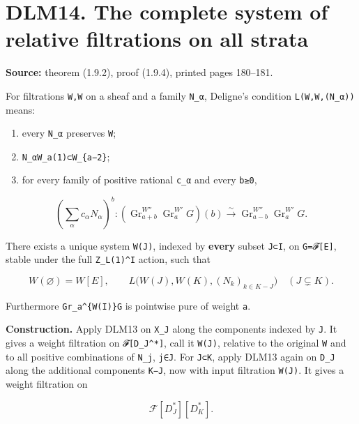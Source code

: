 \documentclass[
]{report}
\providecommand{\tightlist}{%
  \setlength{\itemsep}{0pt}\setlength{\parskip}{0pt}}
\begin{document}
\section{DLM14. The complete system of relative filtrations on all
strata}\label{dlm14.-the-complete-system-of-relative-filtrations-on-all-strata}

\textbf{Source:} theorem (1.9.2), proof (1.9.4), printed pages 180--181.

For filtrations
\texttt{W\textquotesingle{},W\textquotesingle{}\textquotesingle{}} on a
sheaf and a family \texttt{N\_α}, Deligne's condition
\texttt{L(W\textquotesingle{},W\textquotesingle{}\textquotesingle{},(N\_α))}
means:

\begin{enumerate}
\def\labelenumi{\arabic{enumi}.}
\tightlist
\item
  every \texttt{N\_α} preserves \texttt{W\textquotesingle{}};
\item
  \texttt{N\_αW\textquotesingle{}\textquotesingle{}\_a(1)⊂W\textquotesingle{}\textquotesingle{}\_\{a−2\}};
\item
  for every family of positive rational \texttt{c\_α} and every
  \texttt{b≥0},
\end{enumerate}

\[
\left(\sum_\alpha c_\alpha N_\alpha\right)^b:
\left(\operatorname{Gr}_{a+b}^{W''}\operatorname{Gr}_a^{W'}G\right)(b)
\xrightarrow{\sim}
\operatorname{Gr}_{a-b}^{W''}\operatorname{Gr}_a^{W'}G.
\tag{DLM14.1}
\]

There exists a unique system \texttt{W(J)}, indexed by \textbf{every}
subset \texttt{J⊂I}, on \texttt{G=𝓕{[}E{]}}, stable under the full
\texttt{Z\_L(1)\^{}I} action, such that

\[
W(\varnothing)=W[E],\qquad
L\bigl(W(J),W(K),(N_k)_{k\in K-J}\bigr)
\quad(J\subsetneq K).
\tag{DLM14.2}
\]

Furthermore \texttt{Gr\_a\^{}\{W(I)\}G} is pointwise pure of weight
\texttt{a}.

\textbf{Construction.} Apply DLM13 on \texttt{X\_J} along the components
indexed by \texttt{J}. It gives a weight filtration on
\texttt{𝓕{[}D\_J\^{}*{]}}, call it \texttt{W(J)}, relative to the
original \texttt{W} and to all positive combinations of \texttt{N\_j},
\texttt{j∈J}. For \texttt{J⊂K}, apply DLM13 again on \texttt{D\_J} along
the additional components \texttt{K−J}, now with input filtration
\texttt{W(J)}. It gives a weight filtration on

\[
\mathcal F[D_J^*][D_K^*].
\]
\end{document}
